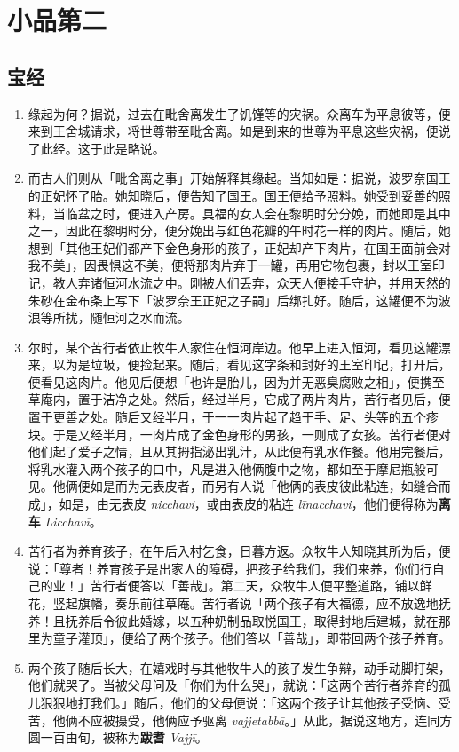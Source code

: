 \chapter{小品第二}

\section{宝经}

\begin{enumerate}\item 缘起为何？据说，过去在毗舍离发生了饥馑等的灾祸。众离车为平息彼等，便来到王舍城请求，将世尊带至毗舍离。如是到来的世尊为平息这些灾祸，便说了此经。这于此是略说。
\item 而古人们则从「毗舍离之事」开始解释其缘起。当知如是：据说，波罗奈国王的正妃怀了胎。她知晓后，便告知了国王。国王便给予照料。她受到妥善的照料，当临盆之时，便进入产房。具福的女人会在黎明时分分娩，而她即是其中之一，因此在黎明时分，便分娩出与红色花瓣的午时花一样的肉片。随后，她想到「其他王妃们都产下金色身形的孩子，正妃却产下肉片，在国王面前会对我不美」，因畏惧这不美，便将那肉片弃于一罐，再用它物包裹，封以王室印记，教人弃诸恒河水流之中。刚被人们丢弃，众天人便接手守护，并用天然的朱砂在金布条上写下「波罗奈王正妃之子嗣」后绑扎好。随后，这罐便不为波浪等所扰，随恒河之水而流。
\item 尔时，某个苦行者依止牧牛人家住在恒河岸边。他早上进入恒河，看见这罐漂来，以为是垃圾，便捡起来。随后，看见这字条和封好的王室印记，打开后，便看见这肉片。他见后便想「也许是胎儿，因为并无恶臭腐败之相」，便携至草庵内，置于洁净之处。然后，经过半月，它成了两片肉片，苦行者见后，便置于更善之处。随后又经半月，于一一肉片起了趋于手、足、头等的五个疹块。于是又经半月，一肉片成了金色身形的男孩，一则成了女孩。苦行者便对他们起了爱子之情，且从其拇指泌出乳汁，从此便有乳水作餐。他用完餐后，将乳水灌入两个孩子的口中，凡是进入他俩腹中之物，都如至于摩尼瓶般可见。他俩便如是而为无表皮者，而另有人说「他俩的表皮彼此粘连，如缝合而成」，如是，由无表皮 \textit{nicchavi}，或由表皮的粘连 \textit{līnacchavi}，他们便得称为\textbf{离车} \textit{Licchavī}。
\item 苦行者为养育孩子，在午后入村乞食，日暮方返。众牧牛人知晓其所为后，便说：「尊者！养育孩子是出家人的障碍，把孩子给我们，我们来养，你们行自己的业！」苦行者便答以「善哉」。第二天，众牧牛人便平整道路，铺以鲜花，竖起旗幡，奏乐前往草庵。苦行者说「两个孩子有大福德，应不放逸地抚养！且抚养后令彼此婚嫁，以五种奶制品取悦国王，取得封地后建城，就在那里为童子灌顶」，便给了两个孩子。他们答以「善哉」，即带回两个孩子养育。
\item 两个孩子随后长大，在嬉戏时与其他牧牛人的孩子发生争辩，动手动脚打架，他们就哭了。当被父母问及「你们为什么哭」，就说：「这两个苦行者养育的孤儿狠狠地打我们。」随后，他们的父母便说：「这两个孩子让其他孩子受恼、受苦，他俩不应被摄受，他俩应予驱离 \textit{vajjetabbā}。」从此，据说这地方，连同方圆一百由旬，被称为\textbf{跋耆} \textit{Vajjī}。

\end{enumerate}

